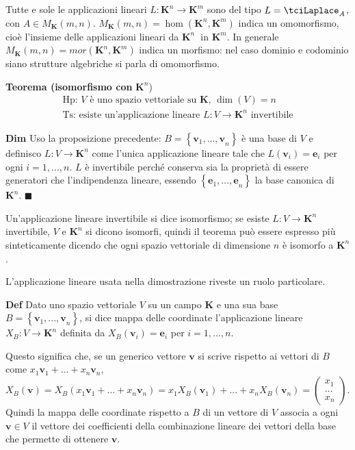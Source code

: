 \documentclass{article}
\begin{document}
\begin{enumerate}
Tutte e sole le applicazioni lineari $L:\mathbf{K}^{n}\mathbf{\rightarrow K}%
^{m}$ sono del tipo $L=\tciLaplace _{A}$, con $A\in M_{\mathbf{K}}\left(
m,n\right) $. $M_{\mathbf{K}}\left( m,n\right) =\hom \left( \mathbf{K}^{n}%
\mathbf{,K}^{m}\right) $ indica un omomorfismo, cio\`{e} l'insieme delle
applicazioni lineari da $\mathbf{K}^{n}$\textbf{\ }in $\mathbf{K}^{m}$. In
generale $M_{\mathbf{K}}\left( m,n\right) =mor\left( \mathbf{K}^{n}\mathbf{,K%
}^{m}\right) $ indica un morfismo: nel caso dominio e codominio siano
strutture algebriche si parla di omomorfismo.
\end{enumerate}

\textbf{Teorema (isomorfismo con }$\mathbf{K}^{n}$)%
\begin{gather*}
\text{Hp}\text{: }V\text{ \`{e} uno spazio vettoriale su }\mathbf{K}\text{, }%
\dim \left( V\right) =n \\
\text{Ts}\text{: esiste un'applicazione lineare }L:V\rightarrow \mathbf{K}%
^{n}\text{ invertibile}
\end{gather*}

\textbf{Dim} Uso la proposizione precedente: $B=\left\{ \mathbf{v}_{1}%
\mathbf{,...,v}_{n}\right\} $ \`{e} una base di $V$ e definisco $%
L:V\rightarrow \mathbf{K}^{n}$ come l'unica applicazione lineare tale che $%
L\left( \mathbf{v}_{i}\right) =\mathbf{e}_{i}$ per ogni $i=1,...,n$. $L$ 
\`{e} invertibile perch\'{e} conserva sia la propriet\`{a} di essere
generatori che l'indipendenza lineare, essendo $\left\{ \mathbf{e}_{1}%
\mathbf{,...,e}_{n}\right\} $ la base canonica di $\mathbf{K}^{n}$. $%
\blacksquare $

Un'applicazione lineare invertibile si dice isomorfismo; se esiste $%
L:V\rightarrow \mathbf{K}^{n}$ invertibile, $V$ e $\mathbf{K}^{n}$ si dicono
isomorfi, quindi il teorema pu\`{o} essere espresso pi\`{u} sinteticamente
dicendo che ogni spazio vettoriale di dimensione $n$ \`{e} isomorfo a $%
\mathbf{K}^{n}$.

L'applicazione lineare usata nella dimostrazione riveste un ruolo
particolare.

\textbf{Def} Dato uno spazio vettoriale $V$ su un campo $\mathbf{K}$ e una
sua base $B=\left\{ \mathbf{v}_{1}\mathbf{,...,v}_{n}\right\} $, si dice
mappa delle coordinate l'applicazione lineare $X_{B}:V\rightarrow \mathbf{K}%
^{n}$ definita da $X_{B}\left( \mathbf{v}_{i}\right) =\mathbf{e}_{i}$ per $%
i=1,...,n$.

Questo significa che, se un generico vettore $\mathbf{v}$ si scrive rispetto
ai vettori di $B$ come $x_{1}\mathbf{v}_{1}+...+x_{n}\mathbf{v}_{n}$, $%
X_{B}\left( \mathbf{v}\right) =X_{B}\left( x_{1}\mathbf{v}_{1}+...+x_{n}%
\mathbf{v}_{n}\right) =x_{1}X_{B}\left( \mathbf{v}_{1}\right)
+...+x_{n}X_{B}\left( \mathbf{v}_{n}\right) =\left( 
\begin{array}{c}
x_{1} \\ 
... \\ 
x_{n}%
\end{array}%
\right) $. Quindi la mappa delle coordinate rispetto a $B$ di un vettore di $%
V$ associa a ogni $\mathbf{v}\in V$ il vettore dei coefficienti della
combinazione lineare dei vettori della base che permette di ottenere $%
\mathbf{v}$.
\end{document}
